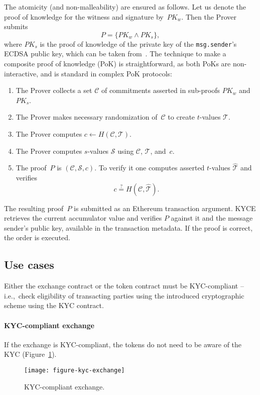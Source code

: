 The atomicity (and non-malleability) are ensured as follows.
Let us denote the proof of knowledge for the witness and signature by~$PK_w$.
Then the Prover submits 
$$
P = \{PK_w \wedge PK_s\},
$$
where $PK_s$ is the proof of knowledge of the private key of the \texttt{msg.sender}'s ECDSA public key, which can be taken from~\cite{Chase2016}.
The technique to make a composite proof of knowledge (PoK) is straightforward, as both PoKs are non-interactive, and is standard in complex PoK protocols:
\begin{enumerate}
	\item The Prover collects a set $\mathcal{C}$ of commitments asserted in sub-proofs $PK_w$ and~$PK_s$.
	\item The Prover makes necessary randomization of~$\mathcal{C}$ to create $t$-values $\mathcal{T}$.
	\item The Prover computes $c \leftarrow H(\mathcal{C},\mathcal{T})$.
	\item The Prover computes $s$-values $\mathcal{S}$ using
	$\mathcal{C}$, $\mathcal{T}$, and~$c$.
	\item The proof~$P$ is $(\mathcal{C}, \mathcal{S},c)$.
	To verify it one computes asserted $t$-values $\widehat{\mathcal{T}}$ and verifies
	$$
	c\overset{?}{=}H(\mathcal{C},\widehat{\mathcal{T}}).
	$$
\end{enumerate}

The resulting proof~$P$ is submitted as an Ethereum transaction argument.
KYCE retrieves the current accumulator value and verifies $P$ against it and the message sender's public key, available in the transaction metadata.
If the proof is correct, the order is executed.


\subsection{Use cases}

Either the exchange contract or the token contract must be KYC-compliant -- i.e.,~check eligibility of transacting parties using the introduced cryptographic scheme using the KYC contract.

\paragraph{KYC-compliant exchange}

If the exchange is KYC-compliant, the tokens do not need to be aware of the KYC (Figure~\ref{fig:KYCCompliantExchange}).

\begin{figure}[h]
	\centering
	\texttt{[image: figure-kyc-exchange]}
	\caption{KYC-compliant exchange.}
	\label{fig:KYCCompliantExchange}
\end{figure}

